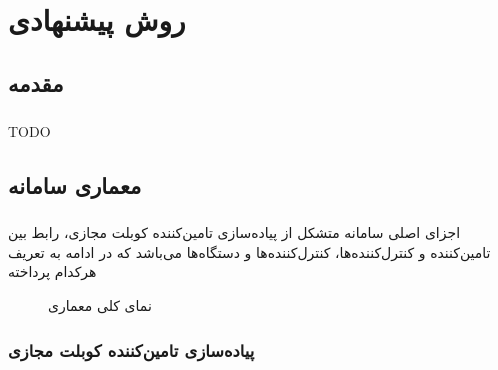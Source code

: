
\chapter{روش پیشنهادی} \label{ch:method}
\thispagestyle{empty}

\section{مقدمه}
\paragraph{}{
    TODO
}

\section{معماری سامانه}
\paragraph{}{
    اجزای اصلی سامانه متشکل از پیاده‌سازی تامین‌کننده کوبلت مجازی، رابط بین تامین‌کننده و کنترل‌کننده‌ها، کنترل‌کننده‌ها و دستگاه‌ها می‌باشد که در ادامه به تعریف هرکدام پرداخته
    \begin{figure}[H]
        \caption{نمای کلی معماری}
        \label{fig:arch}
    \end{figure}
}
\subsection{پیاده‌سازی تامین‌کننده کوبلت مجازی}
\label{subsec:provider}
